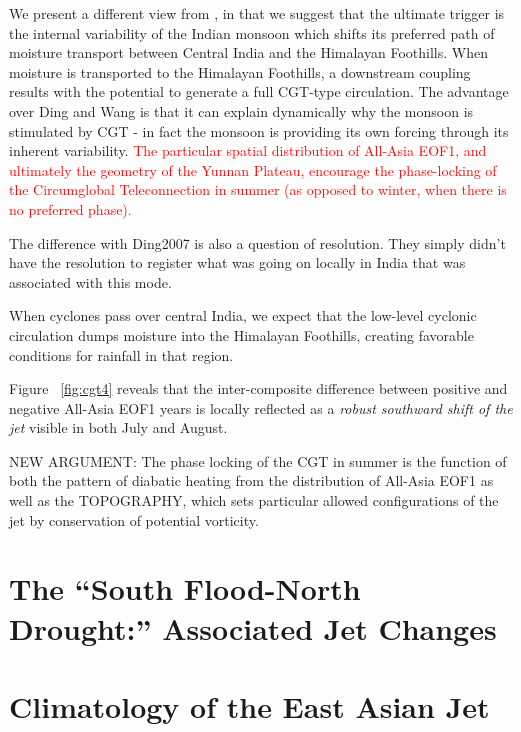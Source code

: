 	We present a different view from \citet{Ding2007}, in that we suggest that the ultimate trigger is the internal variability of the Indian monsoon which shifts its preferred path of moisture transport between Central India and the Himalayan Foothills. When moisture is transported to the Himalayan Foothills, a downstream coupling results with the potential to generate a full CGT-type circulation. The advantage over Ding and Wang is that it can explain dynamically why the monsoon is stimulated by CGT - in fact the monsoon is providing its own forcing through its inherent variability. \textcolor{red}{The particular spatial distribution of All-Asia EOF1, and ultimately the geometry of the Yunnan Plateau, encourage the phase-locking of the Circumglobal Teleconnection in summer (as opposed to winter, when there is no preferred phase).} 
	
	The difference with Ding2007 is also a question of resolution. They simply didn't have the resolution to register what was going on locally in India that was associated with this mode.
	
	When cyclones pass over central India, we expect that the low-level cyclonic circulation dumps moisture into the Himalayan Foothills, creating favorable conditions for rainfall in that region.
	
	Figure ~\ref{fig:cgt4} reveals that the inter-composite difference between positive and negative All-Asia EOF1 years is locally reflected as a \textit{robust southward shift of the jet} visible in both July and August.

	NEW ARGUMENT: The phase locking of the CGT in summer is the function of both the pattern of diabatic heating from the distribution of All-Asia EOF1 as well as the TOPOGRAPHY, which sets particular allowed configurations of the jet by conservation of potential vorticity.

\section{The ``South Flood-North Drought:'' Associated Jet Changes}

\section{Climatology of the East Asian Jet}

